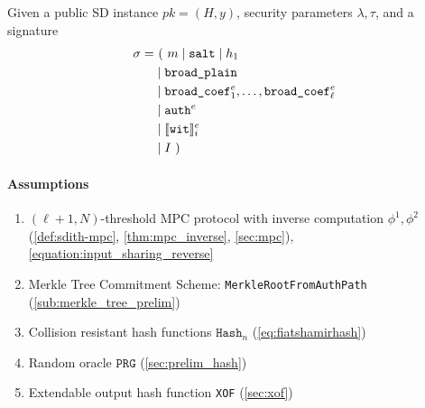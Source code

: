 \documentclass[11pt]{report}
\theoremstyle{definition}
\theoremstyle{plain}
\begin{document}
\begin{protocol}\label{def:sdith-verify}
  \setlength{\parindent}{0pt}
  \setlength{\parskip}{5pt}
  \titlespacing*{\paragraph}{0pt}{1pt}{1em}
  Given a public SD instance $pk = (H, y)$, security parameters $\lambda, \tau$, and a signature
  \begin{align*}
    \sigma = & \ (\ m \mid \texttt{salt} \mid h_1                                \\
             & \mid \texttt{broad\_plain}                                        \\
             & \mid \texttt{broad\_coef}^e_1, \dots, \texttt{broad\_coef}^e_\ell \\
             & \mid \texttt{auth}^e                                              \\
             & \mid \llbracket \texttt{wit} \rrbracket_i^e                                        \\
             & \mid I\ )
  \end{align*}

  \paragraph{Assumptions}
  \begin{enumerate}[itemsep=0pt, topsep=0pt, parsep=0pt]
    \item $(\ell + 1, N)$-threshold MPC protocol with inverse computation $\phi^1, \phi^2$ (\autoref{def:sdith-mpc}, \autoref{thm:mpc_inverse}, \autoref{sec:mpc}), \autoref{equation:input_sharing_reverse}
    \item Merkle Tree Commitment Scheme: \texttt{MerkleRootFromAuthPath} (\autoref{sub:merkle_tree_prelim})
    \item Collision resistant  hash functions $\texttt{Hash}_n$ (\autoref{eq:fiatshamirhash})
    \item Random oracle $\texttt{PRG}$ (\autoref{sec:prelim_hash})
    \item Extendable output hash function \texttt{XOF} (\autoref{sec:xof})
  \end{enumerate}


\end{protocol}
\end{document}
